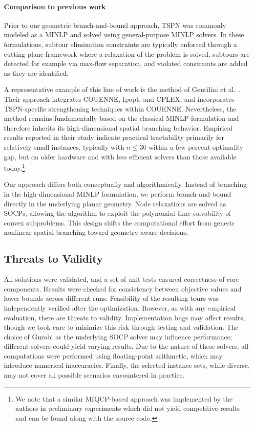 \documentclass[11pt,a4paper]{article}
\theoremstyle{plain}
\begin{document}
\paragraph{Comparison to previous work} Prior to our geometric branch-and-bound approach, TSPN was commonly modeled as a MINLP and solved using general-purpose MINLP solvers. In these formulations, subtour elimination constraints are typically enforced through a cutting-plane framework where a relaxation of the problem is solved, subtours are detected for example via max-flow separation, and violated constraints are added as they are identified.

A representative example of this line of work is the method of Gentilini et al.~\cite{ref29}. Their approach integrates COUENNE, Ipopt, and CPLEX, and incorporates TSPN-specific strengthening techniques within COUENNE. Nevertheless, the method remains fundamentally based on the classical MINLP formulation and therefore inherits its high-dimensional spatial branching behavior. Empirical results reported in their study indicate practical tractability primarily for relatively small instances, typically with $n \leq 30$ within a few percent optimality gap, but on older hardware and with less efficient solvers than those available today.\footnote{We note that a similar MIQCP-based approach was implemented by the authors in preliminary experiments which did not yield competitive results and can be found along with the source code.}

Our approach differs both conceptually and algorithmically. Instead of branching in the high-dimensional MINLP formulation, we perform branch-and-bound directly in the underlying planar geometry. Node relaxations are solved as SOCPs, allowing the algorithm to exploit the polynomial-time solvability of convex subproblems. This design shifts the computational effort from generic nonlinear spatial branching toward geometry-aware decisions.

\subsection{Threats to Validity}

All solutions were validated, and a set of unit tests ensured correctness of core components. Results were checked for consistency between objective values and lower bounds across different runs. Feasibility of the resulting tours was independently verified after the optimization. However, as with any empirical evaluation, there are threats to validity. Implementation bugs may affect results, though we took care to minimize this risk through testing and validation. The choice of Gurobi as the underlying SOCP solver may influence performance; different solvers could yield varying results. Due to the nature of these solvers, all computations were performed using floating-point arithmetic, which may introduce numerical inaccuracies. Finally, the selected instance sets, while diverse, may not cover all possible scenarios encountered in practice.
\end{document}
